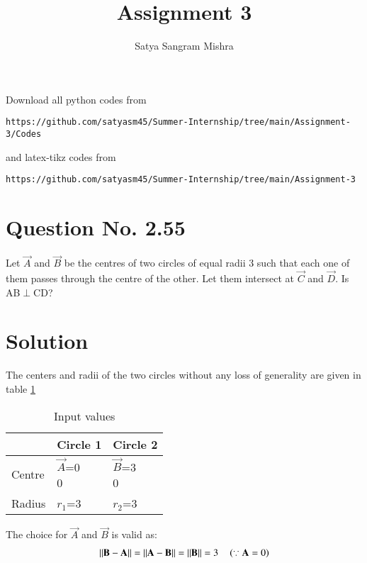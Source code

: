 \documentclass[journal,12pt,twocolumn]{IEEEtran}
\begin{document}
     \def\centbox#1{\makebox[0in]{#1}}
     \def\topbox#1{\raisebox{-\baselineskip}[0in][0in]{#1}}
     \def\midbox#1{\raisebox{-0.5\baselineskip}[0in][0in]{#1}}
\vspace{3cm}
\title{Assignment 3}
\author{Satya Sangram Mishra}
\maketitle
\newpage
\bigskip
\renewcommand{\thefigure}{\theenumi}
\renewcommand{\thetable}{\theenumi}
Download all python codes from 
\begin{lstlisting}
https://github.com/satyasm45/Summer-Internship/tree/main/Assignment-3/Codes
\end{lstlisting}
%
and latex-tikz codes from 
%
\begin{lstlisting}
https://github.com/satyasm45/Summer-Internship/tree/main/Assignment-3
\end{lstlisting}
%
\section{Question No. 2.55}
Let $\vec{A}$ and $\vec{B}$ be the centres of two circles
of equal radii 3 such that each one of them
passes through the centre of the other. Let them
intersect at $\vec{C}$ and $\vec{D}$. Is AB$\perp$CD?
%
\section{Solution}
The centers and radii of the two circles without any loss of generality are given in table \ref{tab:table1}
\begin{table}[!ht]
\begin{center}
\begin{tabular}{ | m{2cm} | m{2cm} | m{2cm} |} 
\hline
 & Circle 1 & Circle 2 \\
\hline
Centre  & $\vec{A}$=\myvec{0\\0} & $\vec{B}$=\myvec{3\\0} \\ 
\hline
Radius & $r_{1}$=3 &$r_{2}$=3  \\ 
\hline
\end{tabular}
\end{center}
\caption{Input values}
\label{tab:table1}

\end{table}

The choice for $\vec{A}$ and $\vec{B}$ is valid as:
\begin{align}
\lVert\mathbf{B}-\mathbf{A}\rVert = \lVert\mathbf{A}-\mathbf{B}\rVert=\lVert\mathbf{B}\rVert  = 3 \quad \left(\because \mathbf{A}=0\right)
\end{align}
\end{document}

